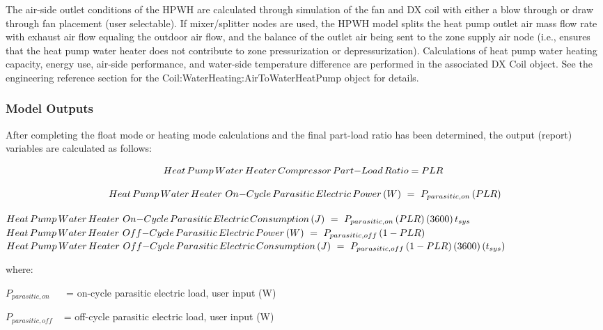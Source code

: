 The air-side outlet conditions of the HPWH are calculated through simulation of the fan and DX coil with either a blow through or draw through fan placement (user selectable). If mixer/splitter nodes are used, the HPWH model splits the heat pump outlet air mass flow rate with exhaust air flow equaling the outdoor air flow, and the balance of the outlet air being sent to the zone supply air node (i.e., ensures that the heat pump water heater does not contribute to zone pressurization or depressurization). Calculations of heat pump water heating capacity, energy use, air-side performance, and water-side temperature difference are performed in the associated DX Coil object. See the engineering reference section for the Coil:WaterHeating:AirToWaterHeatPump object for details.

\subsubsection{Model Outputs}\label{model-outputs-000}

After completing the float mode or heating mode calculations and the final part-load ratio has been determined, the output (report) variables are calculated as follows:

\begin{equation}
Heat\,Pump\,Water\,Heater\,Compressor\,Part{\rm{ - }}Load\,Ratio = PLR\,\,
\end{equation}

\begin{equation}
Heat\,Pump\,Water\,Heater\,\,On{\rm{ - }}Cycle\,Parasitic\,Electric\,Power\,(W)\,\, = \,\,{P_{parasitic,on}}\left( {PLR} \right)
\end{equation}

\(Heat\,Pump\,Water\,Heater\,\,On{\rm{ - }}Cycle\,Parasitic\,Electric\,Consumption\,(J)\,\, = \,\,{P_{parasitic,on}}\left( {PLR} \right)\left( {3600} \right){t_{sys}}\) \(Heat\,Pump\,Water\,Heater\,\,Off{\rm{ - }}Cycle\,Parasitic\,Electric\,Power\,(W)\,\, = \,\,{P_{parasitic,off}}\left( {1 - PLR} \right)\) \(Heat\,Pump\,Water\,Heater\,\,Off{\rm{ - }}Cycle\,Parasitic\,Electric\,Consumption\,(J)\,\, = \,\,{P_{parasitic,off}}\left( {1 - PLR} \right)\left( {3600} \right)\left( {{t_{sys}}} \right)\)

where:

\({P_{parasitic,on}}\) ~~ = on-cycle parasitic electric load, user input (W)

\({P_{parasitic,off}}\) ~ = off-cycle parasitic electric load, user input (W)

